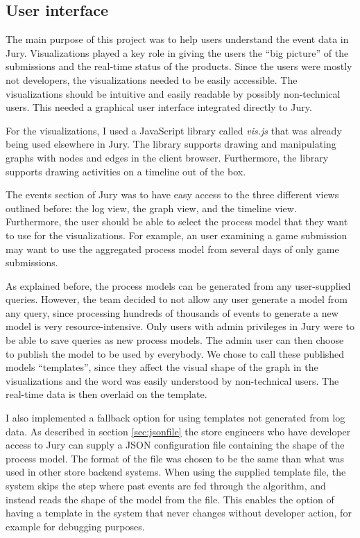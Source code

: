 \subsection{User interface}
\label{sec:userinterface}

The main purpose of this project was to help users understand the event data in Jury.
Visualizations played a key role in giving the users the ``big picture'' of the submissions and the real-time status of the products.
Since the users were mostly not developers, the visualizations needed to be easily accessible.
The visualizations should be intuitive and easily readable by possibly non-technical users.
This needed a graphical user interface integrated directly to Jury.

For the visualizations, I used a JavaScript library called \emph{vis.js} \cite{visjs} that was already being used elsewhere in Jury.
The library supports drawing and manipulating graphs with nodes and edges in the client browser.
Furthermore, the library supports drawing activities on a timeline out of the box.

The events section of Jury was to have easy access to the three different views outlined before: the log view, the graph view, and the timeline view. Furthermore, the user should be able to select the process model that they want to use for the visualizations.
For example, an user examining a game submission may want to use the aggregated process model from several days of only game submissions.

As explained before, the process models can be generated from any user-supplied queries.
However, the team decided to not allow any user generate a model from any query, since processing hundreds of thousands of events to generate a new model is very resource-intensive.
Only users with admin privileges in Jury were to be able to save queries as new process models.
The admin user can then choose to publish the model to be used by everybody.
We chose to call these published models ``templates'', since they affect the visual shape of the graph in the visualizations and the word was easily understood by non-technical users.
The real-time data is then overlaid on the template.

I also implemented a fallback option for using templates not generated from log data. As described in section \ref{sec:jsonfile} the store engineers who have developer access to Jury can supply a JSON configuration file containing the shape of the process model. The format of the file was chosen to be the same than what was used in other store backend systems. 
When using the supplied template file, the system skips the step where past events are fed through the algorithm, and instead reads the shape of the model from the file.  
This enables the option of having a template in the system that never changes without developer action, for example for debugging purposes.

